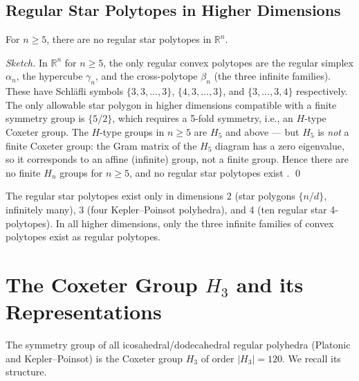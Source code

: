 \subsection{Regular Star Polytopes in Higher Dimensions}
\label{ssec:higher-dimensional}

\begin{theorem}
\label{thm:no-star-higher-dimensions}
For $n \geq 5$, there are no regular star polytopes in
$\mathbb{R}^n$.
\end{theorem}

\begin{proof}[Sketch]
In $\mathbb{R}^n$ for $n \geq 5$, the only regular convex
polytopes are the regular simplex $\alpha_n$, the hypercube
$\gamma_n$, and the cross-polytope $\beta_n$ (the three
infinite families).  These have Schläfli symbols
$\{3,3,\ldots,3\}$, $\{4,3,\ldots,3\}$, and
$\{3,\ldots,3,4\}$ respectively.  The only allowable star
polygon in higher dimensions compatible with a finite symmetry
group is $\{5/2\}$, which requires a 5-fold symmetry, i.e., an
$H$-type Coxeter group.  The $H$-type groups in $n \geq 5$
are $H_5$ and above — but $H_5$ is \emph{not} a finite Coxeter
group: the Gram matrix of the $H_5$ diagram has a zero
eigenvalue, so it corresponds to an affine (infinite) group,
not a finite group.  Hence there are no finite $H_n$ groups
for $n \geq 5$, and no regular star polytopes exist
\cite{coxeter_regular_polytopes}.
\qed
\end{proof}

\begin{corollary}
The regular star polytopes exist only in dimensions 2 (star
polygons $\{n/d\}$, infinitely many), 3 (four Kepler–Poinsot
polyhedra), and 4 (ten regular star 4-polytopes).  In all
higher dimensions, only the three infinite families of convex
polytopes exist as regular polytopes.
\end{corollary}

\section{The Coxeter Group \texorpdfstring{$H_3$}{H3} and its Representations}
\label{sec:h3-group}

The symmetry group of all icosahedral/dodecahedral regular
polyhedra (Platonic and Kepler–Poinsot) is the Coxeter group
$H_3$ of order $|H_3| = 120$.  We recall its structure.

